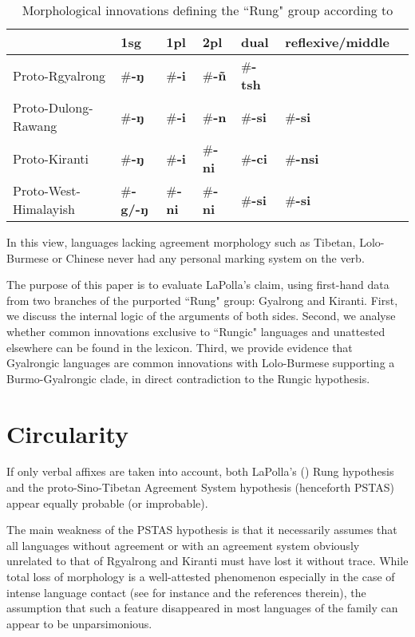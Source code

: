 \documentclass[oldfontcommands,oneside,a4paper,11pt]{article}
\newcommand{\ipa}[1]{{\phon\textbf{#1}}}
\newcommand{\pseud}[1]{\#\ipa{#1}}
\begin{document}
\begin{table}[H] 
\caption{Morphological innovations defining the ``Rung" group according to \citet{lapolla03}}
\label{tab:rung1}
\begin{tabular}{lllllll} 
\toprule
  &   	1sg  &   	1pl  &   	2pl  &   	dual  &   	reflexive/middle  \\   
\midrule
Proto-Rgyalrong  &   	\pseud{-ŋ}  &   	\pseud{-i} &   	\pseud{-ñ}  &   	\pseud{-tsh}  &   	  \\   
Proto-Dulong-Rawang  &   	\pseud{-ŋ}  &   	\pseud{-i}  &   	\pseud{-n}  &   	\pseud{-si}  &   	\pseud{-si}  \\   
Proto-Kiranti  &   	\pseud{-ŋ}  &   	\pseud{-i}  &   	\pseud{-ni}  &   	\pseud{-ci}  &   	\pseud{-nsi}  \\   
Proto-West-Himalayish  &   	\pseud{-g/-ŋ}  &   	\pseud{-ni}  &   	\pseud{-ni}  &   	\pseud{-si}  &   	\pseud{-si}  \\   
\bottomrule
\end{tabular}
\end{table}
In this view, languages lacking agreement morphology such as Tibetan, Lolo-Burmese or Chinese never had any personal marking system on the verb. 


The purpose of this paper is to evaluate LaPolla's claim, using first-hand data from   two branches of the purported ``Rung" group: Gyalrong and Kiranti. First, we   discuss the internal logic of the arguments of both sides. Second, we analyse whether common innovations exclusive to ``Rungic" languages and unattested elsewhere can be found in the lexicon. Third, we provide evidence that Gyalrongic languages are common innovations with Lolo-Burmese supporting a Burmo-Gyalrongic clade, in direct contradiction to the Rungic hypothesis.
 

\section{Circularity}

If only verbal affixes are taken into account,  both LaPolla's (\citeyear{lapolla03}) Rung hypothesis and the proto-Sino-Tibetan Agreement System hypothesis (henceforth PSTAS) appear equally probable (or improbable). 

The main weakness of the PSTAS hypothesis is that it necessarily assumes that all languages without agreement or with an agreement system obviously unrelated to that of Rgyalrong and Kiranti must have lost it without trace. While total loss of morphology is a well-attested phenomenon especially in the case of intense language contact (see  \citealt{delancey10replacement} for instance and the references therein), the assumption that such a feature disappeared in most languages of the family can appear to be unparsimonious.
\end{document}
